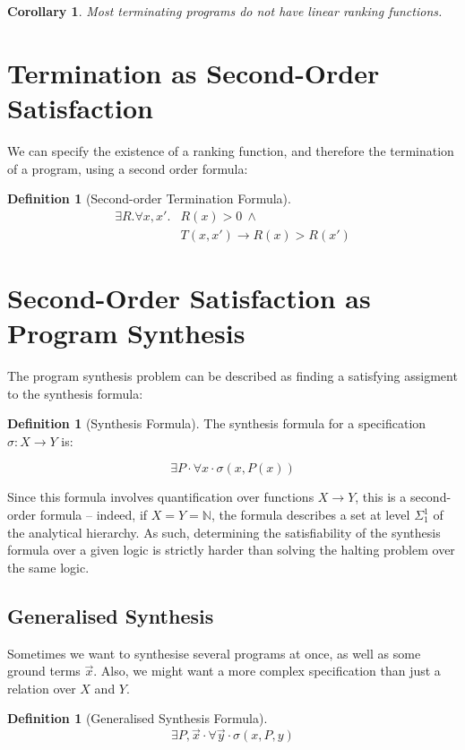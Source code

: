 \documentclass[preprint]{sigplanconf}
\newtheorem{corollary}[theorem]{Corollary}
\theoremstyle{definition}
\newtheorem{definition}[theorem]{Definition}
\begin{document}
\begin{corollary}
 Most terminating programs do not have linear ranking functions.
\end{corollary}


\section{Termination as Second-Order Satisfaction}
We can specify the existence of a ranking function, and therefore the termination
of a program, using a second order formula:

\begin{definition}[Second-order Termination Formula]
\begin{align*}
 \exists R . \forall x, x' . & R(x) > 0 ~ \wedge \\
                             & T(x, x') \rightarrow R(x) > R(x')
\end{align*}
\end{definition}

\section{Second-Order Satisfaction as Program Synthesis}
The program synthesis problem can be described as finding a satisfying assigment to the
synthesis formula:

\begin{definition}[Synthesis Formula]
 The synthesis formula for a specification $\sigma: X \to Y$ is:
 
 $$\exists P \cdotp \forall x \cdotp \sigma(x, P(x))$$
 \end{definition}

Since this formula involves quantification over functions $X \to Y$,
this is a second-order formula -- indeed, if $X = Y = \mathbb{N}$,
the formula describes a set at level $\Sigma_1^1$ of the analytical
hierarchy.  As such, determining the satisfiability of the synthesis
formula over a given logic is strictly harder than solving the
halting problem over the same logic.

\subsection{Generalised Synthesis}
Sometimes we want to synthesise several programs at once, as well as some
ground terms $\vec{x}$.  Also, we might want a more complex specification
than just a relation over $X$ and $Y$.

\begin{definition}[Generalised Synthesis Formula]
 $$\exists P, \vec{x} \cdotp \forall \vec{y} \cdotp \sigma(x, P, y) $$
\end{definition}
\end{document}
